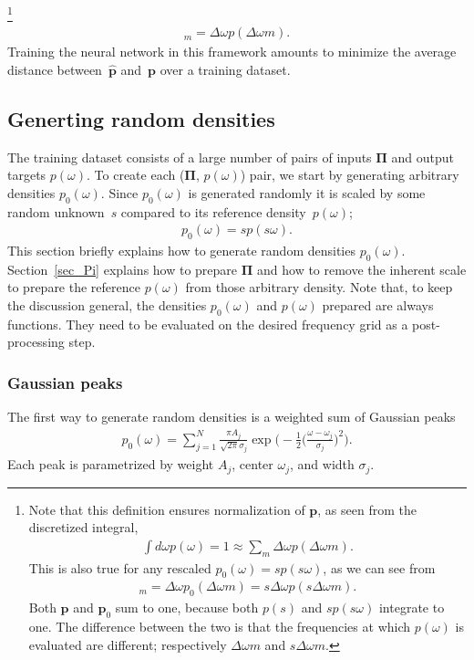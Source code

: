 \documentclass[notitlepage, 11pt, nofootinbib]{revtex4-1}
\renewcommand{\vec}[1]{\bm{#1}}
\begin{document}
    \footnote{Note that this definition ensures normalization of $\vec p$, as seen from the discretized integral,
    \begin{align}
    \int d\omega p(\omega) = 1 \approx \sum_m \Delta\omega p(\Delta\omega m).
    \end{align}
    This is also true for any rescaled $p_0(\omega)= sp(s\omega)$, as we can see from
    \begin{align}
        [\vec p_0]_m = \Delta\omega p_0(\Delta\omega m) = s\Delta\omega p(s\Delta\omega m).
    \end{align}
    Both $\vec p$ and $\vec p_0$ sum to one, because both $p(s)$ and $sp(s\omega)$ integrate to one. The difference between the two is that the frequencies at which $p(\omega)$ is evaluated are different; respectively $\Delta\omega m$ and $s\Delta\omega m$.}
\begin{align}
    [\vec p]_m = \Delta\omega p(\Delta\omega m).
\end{align}
Training the neural network in this framework amounts to minimize the average distance between~$\hat{\vec p}$ and~$\vec p$ over a training dataset.

\subsection{Generting random densities}
\label{sec_distribution}
The training dataset consists of a large number of pairs of inputs $\vec \Pi$ and output targets $p(\omega)$. To create each ($\vec \Pi$, $p(\omega)$) pair, we start by generating arbitrary densities $p_0(\omega)$. 
Since $p_0(\omega)$ is generated randomly it is scaled by some random unknown~$s$ compared to its reference density~$p(\omega)$;
\begin{align}
    p_0(\omega)=sp(s\omega). 
\end{align}
This section briefly explains how to generate random densities $p_0(\omega)$. Section~\ref{sec_Pi} explains how to prepare $\vec \Pi$ and how to remove the inherent scale to prepare the reference $p(\omega)$ from those arbitrary density. Note that, to keep the discussion general, the densities $p_0(\omega)$ and $p(\omega)$ prepared are always functions. They need to be evaluated on the desired frequency grid as a post-processing step.

\subsubsection{Gaussian peaks}
The first way to generate random densities is a weighted sum of Gaussian peaks 
\begin{align}
p_0(\omega)
=
\sum_{j=1}^{N} 
\frac{\pi A_j}{\sqrt{2\pi} \sigma_j}
\exp\bigg(-\frac{1}{2}\Big(\frac{\omega-\omega_j}{\sigma_j}\Big)^2\bigg).
\end{align}
Each peak is parametrized by weight $A_j$, center $\omega_j$, and width $\sigma_j$.
\end{document}
